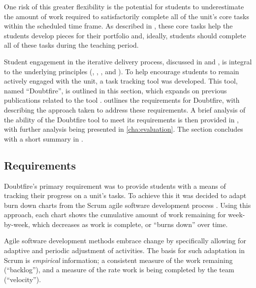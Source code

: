 One risk of this greater flexibility is the potential for students to underestimate the amount of work required to satisfactorily complete all of the unit's core tasks within the scheduled time frame. As described in , these core tasks help the students develop pieces for their portfolio and, ideally, students should complete all of these tasks during the teaching period. 

Student engagement in the iterative delivery process, discussed in  and , is integral to the underlying principles (, , , and ). To help encourage students to remain actively engaged with the unit, a task tracking tool was developed. This tool, named ``Doubtfire'', is outlined in this section, which expands on previous publications related to the tool \cite{Cain:2013b,Woodward:2013}.  outlines the requirements for Doubtfire, with  describing the approach taken to address these requirements. A brief analysis of the ability of the Doubtfire tool to meet its requirements is then provided in , with further analysis being presented in \cref{cha:evaluation}. The section concludes with a short summary in .


\subsection{Requirements} %
\label{sub:doubtfire_requirements}

Doubtfire's primary requirement was to provide students with a means of tracking their progress on a unit's tasks. To achieve this it was decided to adapt burn down charts from the Scrum agile software development process \cite{Schwaber:2002}. Using this approach, each chart shows the cumulative amount of work remaining for week-by-week, which decreases as work is complete, or ``burns down'' over time.

Agile software development methods \cite{Beck:2001} embrace change \cite{Beck:2000} by specifically allowing for adaptive and periodic adjustment of activities. The basis for such adaptation in Scrum is \emph{empirical} information; a consistent measure of the work remaining (``backlog''), and a measure of the rate work is being completed by the team (``velocity'').

